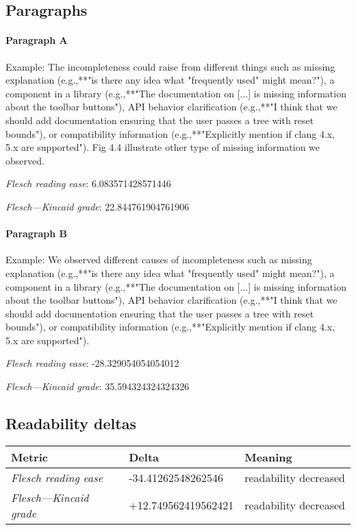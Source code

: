 \subsection{Paragraphs}
\paragraph{Paragraph A}
Example: The incompleteness could raise from different things such as missing explanation (e.g.,**"is there any idea what "frequently used" might mean?"), a component in a library (e.g.,**"The documentation on [...] is missing information about the toolbar buttons"), API behavior clarification (e.g.,**"I think that we should add documentation ensuring that the user passes a tree with reset bounds"), or compatibility information (e.g.,**"Explicitly mention if clang 4.x, 5.x are supported"). Fig 4.4 illustrate other type of missing information we observed.\par\medskip\emph{Flesch reading ease}: 6.083571428571446\par\emph{Flesch---Kincaid grade}: 22.844761904761906

\paragraph{Paragraph B}
Example: We observed different causes of incompleteness such as missing explanation (e.g.,**"is there any idea what "frequently used" might mean?"), a component in a library (e.g.,**"The documentation on [...] is missing information about the toolbar buttons"), API behavior clarification (e.g.,**"I think that we should add documentation ensuring that the user passes a tree with reset bounds"), or compatibility information (e.g.,**"Explicitly mention if clang 4.x, 5.x are supported").\par\medskip\emph{Flesch reading ease}: -28.329054054054012\par\emph{Flesch---Kincaid grade}: 35.594324324324326

\subsection{Readability deltas}

\begin{tabular}{lll}
\toprule
               \textbf{Metric} &       \textbf{Delta} &       \textbf{Meaning} \\
\midrule
    \emph{Flesch reading ease} &   -34.41262548262546 &  readability decreased \\
 \emph{Flesch---Kincaid grade} &  +12.749562419562421 &  readability decreased \\
\bottomrule
\end{tabular}

